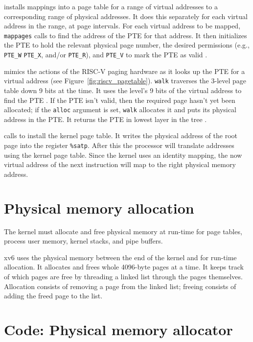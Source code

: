 installs mappings into a page table
for a range of virtual addresses to
a corresponding range of physical addresses.
It does this separately for each virtual address in the range,
at page intervals.
For each virtual address to be mapped,
\lstinline{mappages}
calls
to find the address of the PTE for that address.
It then initializes the PTE to hold the relevant physical page
number, the desired permissions (e.g.,
\lstinline{PTE_W}
\lstinline{PTE_X},
and/or
\lstinline{PTE_R}),
and
\lstinline{PTE_V}
to mark the PTE as valid
.

mimics the actions of the RISC-V paging hardware as it
looks up the PTE for a virtual address (see
Figure~\ref{fig:riscv_pagetable}).
\lstinline{walk}
traverses the 3-level page table down 9 bits at the time.
It uses the level's 9 bits of the virtual address to find
the PTE
.
If the PTE isn't valid, then
the required page hasn't yet been allocated;
if the
\lstinline{alloc}
argument is set,
\lstinline{walk}
allocates it and puts its physical address in the PTE.
It returns the PTE in lowest layer in the tree
.

calls
to install the kernel page table.
It writes the physical address of the root page
into the register
\texttt{\%satp}.
After this the processor will translate addresses using the kernel
page table.  Since the kernel uses an identity mapping, the now
virtual address of the next instruction will map to the right physical
memory address.
\section{Physical memory allocation}

The kernel must allocate and free physical memory at run-time for
page tables,
process user memory,
kernel stacks,
and pipe buffers.

xv6 uses the physical memory between the end of the kernel and
for run-time allocation. It allocates and frees whole 4096-byte pages
at a time. It keeps track of which pages are free by threading a
linked list through the pages themselves. Allocation consists of
removing a page from the linked list; freeing consists of adding the
freed page to the list.
\section{Code: Physical memory allocator}

